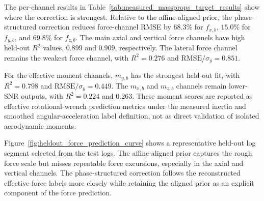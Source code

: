 The per-channel results in Table~\ref{tab:measured_massprops_target_results} show where the correction is strongest. Relative to the affine-aligned prior, the phase-structured correction reduces force-channel RMSE by $68.3\%$ for $f_{x,b}$, $15.0\%$ for $f_{y,b}$, and $69.8\%$ for $f_{z,b}$. The main axial and vertical force channels have high held-out $R^2$ values, $0.899$ and $0.909$, respectively. The lateral force channel remains the weakest force channel, with $R^2=0.276$ and $\mathrm{RMSE}/\sigma_y=0.851$.

For the effective moment channels, $m_{y,b}$ has the strongest held-out fit, with $R^2=0.798$ and $\mathrm{RMSE}/\sigma_y=0.449$. The $m_{x,b}$ and $m_{z,b}$ channels remain lower-SNR outputs, with $R^2=0.224$ and $0.263$. These moment scores are reported as effective rotational-wrench prediction metrics under the measured inertia and smoothed angular-acceleration label definition, not as direct validation of isolated aerodynamic moments.

\begin{table}[t]
\centering
\caption{Target-wise held-out test metrics for the affine-aligned prior and the phase-structured correction. $\sigma_y$ is the held-out target standard deviation. Force and moment channels are interpreted separately because they have different units and label sensitivities.}
\label{tab:measured_massprops_target_results}
\end{table}

Figure~\ref{fig:heldout_force_prediction_curve} shows a representative held-out log segment selected from the test logs. The affine-aligned prior captures the rough force scale but misses repeatable force excursions, especially in the axial and vertical channels. The phase-structured correction follows the reconstructed effective-force labels more closely while retaining the aligned prior as an explicit component of the force prediction.

